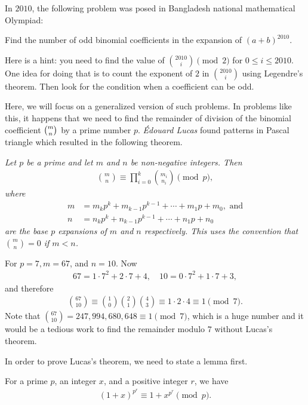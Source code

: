 \documentclass[12pt]{subfile}
\begin{document}
In $2010$, the following problem was posed in Bangladesh national mathematical Olympiad:
	\begin{problem}
		Find the number of odd binomial coefficients in the expansion of $(a+b)^{2010}$.
	\end{problem}
Here is a hint: you need to find the value of $\binom{2010}{i}\pmod2$ for $0\leq i\leq2010$. One idea for doing that is to count the exponent of $2$ in $\binom{2010}{i}$ using Legendre's theorem. Then look for the condition when a coefficient can be odd.

Here, we will focus on a generalized version of such problems. In problems like this, it happens that we need to find the remainder of division of the binomial coefficient $\tbinom{m}{n}$ by a prime number $p$. \textit{\'{E}douard Lucas} found patterns in Pascal triangle which resulted in the following theorem.
	\begin{theorem}\slshape
		Let $p$ be a prime and let $m$ and $n$ be non-negative integers. Then
			\begin{align*}
				\binom{m}{n}\equiv\prod_{i=0}^k\binom{m_i}{n_i}\pmod p,
			\end{align*}
		where
			\begin{align*}
				m&=m_kp^k+m_{k-1}p^{k-1}+\cdots +m_1p+m_0, \text{ and}\\
				n&=n_kp^k+n_{k-1}p^{k-1}+\cdots +n_1p+n_0
			\end{align*}
		are the base $p$ expansions of $m$ and $n$ respectively. This uses the convention that $\binom{m}{n}=0$ if $m<n$.
	\end{theorem}
	
	\begin{example}
		For $p=7, m=67$, and $n=10$. Now
			\begin{align*}
				67 = 1 \cdot 7^2 + 2 \cdot 7 + 4, \quad 10 = 0 \cdot 7^2 + 1 \cdot 7 + 3,
			\end{align*}
		and therefore
			\begin{align*}
				\binom{67}{10}\equiv\binom{1}{0}\binom{2}{1}\binom{4}{3}\equiv 1 \cdot 2 \cdot 4 \equiv 1 \pmod 7.
			\end{align*}
		Note that $\binom{67}{10} = 247,994,680,648 \equiv 1 \pmod 7$, which is a huge number and it would be a tedious work to find the remainder modulo $7$ without Lucas's theorem.
	\end{example}
In order to prove Lucas's theorem, we need to state a lemma first.
	\begin{lemma}
		For a prime $p$, an integer $x$, and a positive integer $r$, we have
			\begin{align*}
				(1+x)^{p^r}\equiv 1+x^{p^r}\pmod{p}.
			\end{align*}
	\end{lemma}
	
\end{document}
